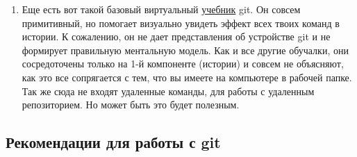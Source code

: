 \documentclass{article}
\begin{document}
\begin{enumerate}
\item Еще есть вот такой базовый виртуальный \href{https://learngitbranching.js.org/ }{учебник} git. Он совсем примитивный, но помогает визуально увидеть эффект всех твоих команд в истории. К сожалению, он не дает представления об устройстве git и не формирует правильную ментальную модель. Как и все другие обучалки, они сосредоточены только на 1-й компоненте (истории) и совсем не объясняют, как это все сопрягается с тем, что вы имеете на компьютере в рабочей папке. Так же сюда не входят удаленные команды, для работы с удаленным репозиторием. Но может быть это будет полезным.

\end{enumerate}

\subsection{Рекомендации для работы с git}
\end{document}

